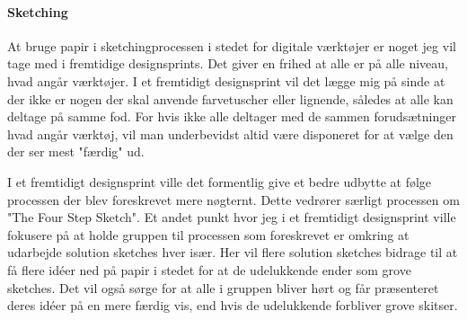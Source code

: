 \documentclass{article}
\begin{document}
\paragraph{Sketching} At bruge papir i sketchingprocessen i stedet for digitale
værktøjer er noget jeg vil tage med i fremtidige designsprints. Det giver en
frihed at alle er på alle niveau, hvad angår værktøjer. I et fremtidigt
designsprint vil det lægge mig på sinde at der ikke er nogen der skal anvende
farvetuscher eller lignende, således at alle kan deltage på samme fod. For hvis
ikke alle deltager med de sammen forudsætninger hvad angår værktøj, vil man
underbevidst altid være disponeret for at vælge den der ser mest "færdig" ud.

I et fremtidigt designsprint ville det formentlig give et bedre udbytte at følge
processen der blev foreskrevet mere nøgternt. Dette vedrører særligt processen
om "The Four Step Sketch". Et andet punkt hvor jeg i et fremtidigt designsprint
ville fokusere på at holde gruppen til processen som foreskrevet er omkring at
udarbejde solution sketches hver især. Her vil flere solution sketches bidrage
til at få flere idéer ned på papir i stedet for at de udelukkende ender som
grove sketches. Det vil også sørge for at alle i gruppen bliver hørt og får
præsenteret deres idéer på en mere færdig vis, end hvis de udelukkende forbliver
grove skitser.
\end{document}
